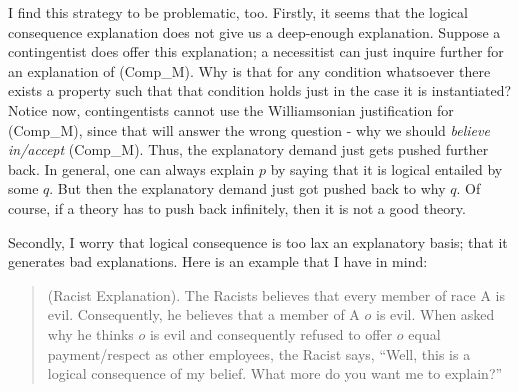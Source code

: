 I find this strategy to be problematic, too. 
Firstly, it seems that the logical consequence explanation does not give us a deep-enough explanation. Suppose a contingentist does offer this explanation; a necessitist can just inquire further for an explanation of (Comp_M). Why is that for any condition whatsoever there exists a property such that that condition holds just in the case it is instantiated? Notice now, contingentists cannot use the Williamsonian justification for (Comp_M), since that will answer the wrong question - why we should \emph{believe in/accept} (Comp_M). Thus, the explanatory demand just gets pushed further back. In general, one can always explain $p$ by saying that it is logical entailed by some $q$. But then the explanatory demand just got pushed back to why $q$. Of course, if a theory has to push back infinitely, then it is not a good theory. 

Secondly, I worry that logical consequence is too lax an explanatory basis; that it generates bad explanations. 
Here is an example that I have in mind:

\begin{quote}
(Racist Explanation). \hspace{\labelsep} The Racists believes that every member of race A is evil. Consequently, he believes that a member of A $o$ is evil. When asked why he thinks $o$ is evil and consequently refused to offer $o$ equal payment/respect as other employees, the Racist says, ``Well, this is a logical consequence of my belief. What more do you want me to explain?''
\end{quote}

